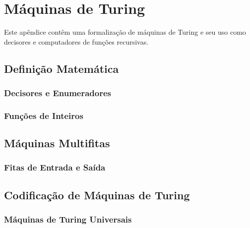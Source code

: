 \chapter{Máquinas de Turing}
\label{maqs_turing}

Este apêndice contêm uma formalização de máquinas de Turing
e seu uso como decisores e computadores de funções recursivas.

\section{Definição Matemática}

\subsection{Decisores e Enumeradores}

\subsection{Funções de Inteiros}

\section{Máquinas Multifitas}

\subsection{Fitas de Entrada e Saída}

\section{Codificação de Máquinas de Turing}

\subsection{Máquinas de Turing Universais}

